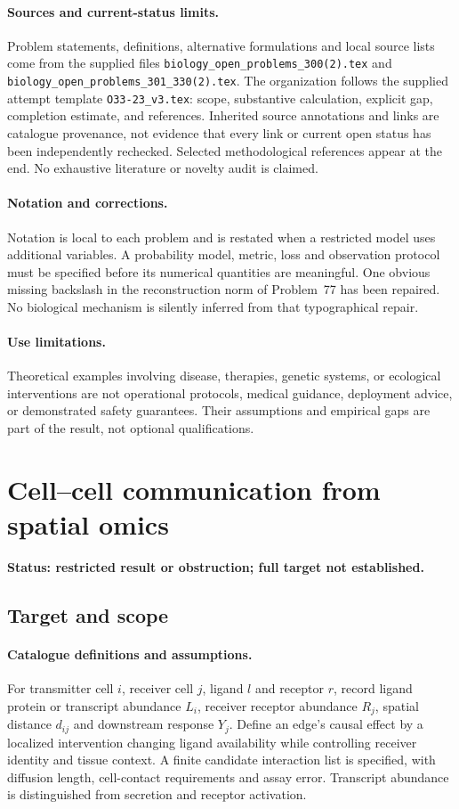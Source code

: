 \documentclass[11pt]{article}
\begin{document}
\paragraph{Sources and current-status limits.}
Problem statements, definitions, alternative formulations and local source lists
come from the supplied files
\texttt{biology\_open\_problems\_300(2).tex} and
\texttt{biology\_open\_problems\_301\_330(2).tex}.
The organization follows the supplied attempt template
\texttt{O33-23\_v3.tex}: scope, substantive calculation, explicit gap,
completion estimate, and references. Inherited source annotations and links are
catalogue provenance, not evidence that every link or current open status has
been independently rechecked. Selected methodological references appear at the
end. No exhaustive literature or novelty audit is claimed.

\paragraph{Notation and corrections.}
Notation is local to each problem and is restated when a restricted model uses
additional variables. A probability model, metric, loss and observation protocol
must be specified before its numerical quantities are meaningful. One obvious
missing backslash in the reconstruction norm of Problem~77 has been repaired.
No biological mechanism is silently inferred from that typographical repair.

\paragraph{Use limitations.}
Theoretical examples involving disease, therapies, genetic systems, or ecological
interventions are not operational protocols, medical guidance, deployment advice,
or demonstrated safety guarantees. Their assumptions and empirical gaps are part
of the result, not optional qualifications.


\section*{Cell–cell communication from spatial omics}
\label{prob:076}
\noindent\textbf{Status: restricted result or obstruction; full target not established.}
\subsection{Target and scope}
\paragraph{Catalogue definitions and assumptions.}
For transmitter cell $i$, receiver cell $j$, ligand $l$ and receptor $r$, record ligand protein or transcript abundance $L_i$, receiver receptor abundance $R_j$, spatial distance $d_{ij}$ and downstream response $Y_j$. Define an edge's causal effect by a localized intervention changing ligand availability while controlling receiver identity and tissue context. A finite candidate interaction list is specified, with diffusion length, cell-contact requirements and assay error. Transcript abundance is distinguished from secretion and receptor activation.
\end{document}
